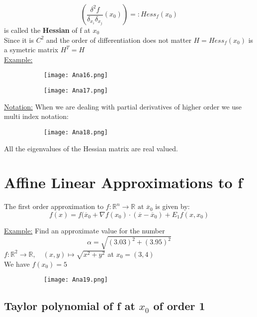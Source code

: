 \documentclass[8pt]{extreport}
\newcommand{\R}{\mathbb{R}}
\begin{document}
$$ (\frac{\delta^2 f}{\delta_{x_i} \delta_{x_j}}(x_0)) =: Hess_f(x_0)$$
is called the \textbf{Hessian} of f at $x_0$\\
Since it is $C^2$ and the order of differentiation does not matter $H =Hess_f(x_0)$ is a symetric matrix $H^T = H$\\
\underline{Example:}
\begin{figure}[H]
\centering
\begin{subfigure}[b]{0.4\linewidth}
\texttt{[image: Ana16.png]}
\end{subfigure}
\begin{subfigure}[b]{0.4\linewidth}
\texttt{[image: Ana17.png]}
\end{subfigure}
\end{figure}
\underline{Notation:} When we are dealing with partial derivatives of higher order we use multi index notation:
\begin{figure}[H]
\centering
\begin{subfigure}[b]{0.4\linewidth}
\texttt{[image: Ana18.png]}
\end{subfigure}
\end{figure}
All the eigenvalues of the Hessian matrix are real valued.
\section{Affine Linear Approximations to f}

The first order approximation to $f:\R^n \to \R \text{ at } \overline{x}_0$
 is given by:
$$f(x) = f(\overline{x}_0  + \nabla f(x_0)\cdot(\overline{x} - \overline{x}_0)+ E_1f(x,x_0)$$

\underline{Example:} Find an approximate value for the number
$$\alpha = \sqrt{(3.03)^2 +(3.95)^2}$$
$f:\R^2 \to \R, \quad (x,y) \mapsto \sqrt{x^2+y^2}$ at $x_0 =(3,4)$\\
We have $f(x_0) = 5$
\begin{figure}[H]
\centering
\begin{subfigure}[b]{0.4\linewidth}
\texttt{[image: Ana19.png]}
\end{subfigure}
\end{figure}


 \subsection{Taylor polynomial of f at $x_0$ of order 1}
\end{document}
